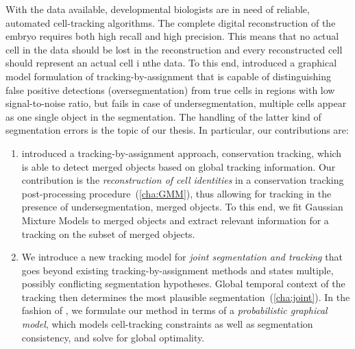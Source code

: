 With the data available, developmental biologists are in need of reliable, automated cell-tracking
algorithms. The complete digital reconstruction of the embryo requires both high recall and high
precision. This means that no actual cell in the data should be lost in the reconstruction and every
reconstructed cell should represent an actual cell i nthe data. To this end,
\citet{kausler_12_discrete} introduced a graphical model formulation of tracking-by-assignment that
is capable of distinguishing false positive detections (oversegmentation) from true cells in regions
with low signal-to-noise ratio, but fails in case of undersegmentation, \ie multiple cells appear as
one single object in the segmentation. The handling of the latter kind of segmentation errors is the
topic of our thesis. In particular, our contributions are:
\begin{enumerate}
      \item \citet{schiegg_13_conservation} introduced a tracking-by-assignment approach,
    conservation tracking, which is able to detect merged objects based on global tracking
    information. Our contribution is the \emph{reconstruction of cell identities} in a conservation
    tracking post-processing procedure~(\cref{cha:GMM}), thus allowing for tracking in the presence
    of undersegmentation, \ie merged objects. To this end, we fit Gaussian Mixture Models to merged objects and extract
    relevant information for a tracking on the subset of merged objects.
      \item We introduce a new tracking model for \emph{joint segmentation and tracking} that goes
    beyond existing tracking-by-assignment methods and states multiple, possibly conflicting
    segmentation hypotheses. Global temporal context of the tracking then determines the most
    plausible segmentation~(\cref{cha:joint}). In the fashion of
    \citet{kausler_12_discrete,schiegg_13_conservation}, we formulate our method in terms of a
    \emph{probabilistic graphical model}, which models cell-tracking constraints as well as
    segmentation consistency, and solve for global optimality.%
\end{enumerate}

